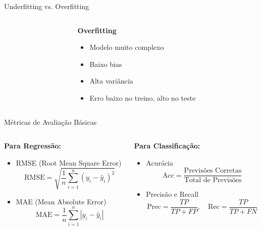 \documentclass[xcolor=dvipsnames,t,aspectratio=169]{beamer} %
\begin{document}
\begin{frame}[c]{Underfitting vs. Overfitting}
\begin{columns}[c]
\begin{column}{0.33\textwidth}
\begin{itemize}
            \end{itemize}
        \end{column}
        \begin{column}{0.33\textwidth}
            \centering
            \textbf{Overfitting}\\
            \vspace{0.1cm}
            \begin{itemize}
                \small
                \item Modelo muito complexo
                \item Baixo bias
                \item Alta variância
                \item Erro baixo no treino, alto no teste
            \end{itemize}
        \end{column}
    \end{columns}
\end{frame}

\begin{frame}[c]{Métricas de Avaliação Básicas}
    \begin{columns}[c]
        \begin{column}{0.5\textwidth}
            \textbf{Para Regressão:}
            \begin{itemize}
                \item RMSE (Root Mean Square Error) $$\text{RMSE} = \sqrt{\frac{1}{n}\sum_{i=1}^{n}(y_i - \hat{y}_i)^2}$$
                \item MAE (Mean Absolute Error) $$\text{MAE} = \frac{1}{n}\sum_{i=1}^{n}|y_i - \hat{y}_i|$$
            \end{itemize}
        \end{column}
        \begin{column}{0.5\textwidth}
            \textbf{Para Classificação:}
            \begin{itemize}
                \item Acurácia $$\text{Acc} = \frac{\text{Previsões Corretas}}{\text{Total de Previsões}}$$
                \item Precisão e Recall $$\text{Prec} = \frac{TP}{TP + FP}, \quad \text{Rec} = \frac{TP}{TP + FN}$$
            \end{itemize}
        \end{column}
    \end{columns}
\end{frame}
\end{document}
